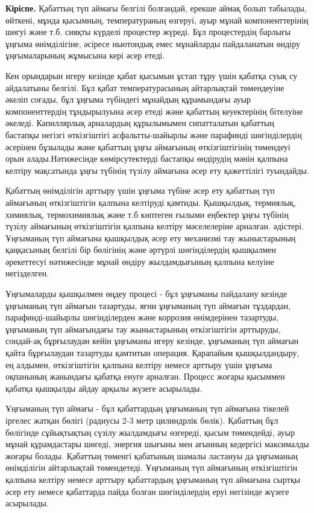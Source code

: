 \begin{multicols}{2}
{\bfseries Кіріспе.} Қабаттың түп аймағы белгілі болғандай, ерекше аймақ
болып табылады, өйткені, мұнда қысымның, температураның өзгеруі, ауыр
мұнай компоненттерінің шөгуі және т.б. сияқты күрделі процестер жүреді.
Бұл процестердің барлығы ұңғыма өнімділігіне, әсіресе ньютондық емес
мұнайларды пайдаланатын өндіру ұңғымаларының жұмысына кері әсер етеді.

Кен орындарын игеру кезінде қабат қысымын ұстап тұру үшін қабатқа суық
су айдалатыны белгілі. Бұл қабат температурасының айтарлықтай
төмендеуіне әкеліп соғады, бұл ұңғыма түбіндегі мұнайдың құрамындағы
ауыр компоненттердің тұндырылуына әсер етеді және қабаттың кеуектерінің
бітелуіне әкеледі. Капиллярлық арналардың құрылымымен сипатталатын
қабаттың бастапқы негізгі өткізгіштігі асфальтты-шайырлы және парафинді
шөгінділердің әсерінен бұзылады және қабаттың ұңғы аймағының
өткізгіштігінің төмендеуі орын алады.Нәтижесінде көмірсутектерді
бастапқы өндірудің мәнін қалпына келтіру мақсатында ұңғы түбінің түзілу
аймағына әсер ету қажеттілігі туындайды.

Қабаттың өнімділігін арттыру үшін ұңғыма түбіне әсер ету қабаттың түп
аймағының өткізгіштігін қалпына келтіруді қамтиды. Қышқылдық, термиялық,
химиялық, термохимиялық және т.б көптеген ғылыми еңбектер ұңғы түбінің
түзілу аймағының өткізгіштігін қалпына келтіру мәселелеріне арналған.
әдістері. Ұңғыманың түп аймағына қышқылдық әсер ету механизмі тау
жыныстарының қаңқасының белгілі бір бөлігінің және әртүрлі шөгінділердің
қышқылмен әрекеттесуі нәтижесінде мұнай өндіру жылдамдығының қалпына
келуіне негізделген.

Ұңғымаларды қышқылмен өңдеу процесі - бұл ұңғыманы пайдалану кезінде
ұңғыманың түп аймағын тазартуды, яғни ұңғыманың түп аймағын тұздардан,
парафинді-шайырлы шөгінділерден және коррозия өнімдерінен тазартуды,
ұңғыманың түп аймағындағы тау жыныстарының өткізгіштігін арттыруды,
сондай-ақ бұрғылаудан кейін ұңғыманы игеру кезінде, ұңғыманың түп
аймағын қайта бұрғылаудан тазартуды қамтитын операция. Қарапайым
қышқылдандыру, ең алдымен, өткізгіштігін қалпына келтіру немесе арттыру
үшін ұңғыма оқпанының жанындағы қабатқа енуге арналған. Процесс жоғары
қысыммен қабатқа қышқылды айдау арқылы жүзеге асырылады.

Ұңғыманың түп аймағы - бұл қабаттардың ұңғыманың түп аймағына тікелей
іргелес жатқан бөлігі (радиусы 2-3 метр цилиндрлік бөлік). Қабаттың бұл
бөлігінде сұйықтықтың сүзілу жылдамдығы өзгереді, қысым төмендейді, ауыр
мұнай құрамдастары шөгеді, энергия шығыны мен ағынның кедергісі
максималды жоғары болады. Қабаттың төменгі қабатының шамалы ластануы да
ұңғыманың өнімділігін айтарлықтай төмендетеді. Ұңғыманың түп аймағының
өткізгіштігін қалпына келтіру немесе арттыру қабаттардың ұңғыманың түп
аймағына сыртқы әсер ету немесе қабаттарда пайда болған шөгінділердің
еруі негізінде жүзеге асырылады.


\end{multicols}
